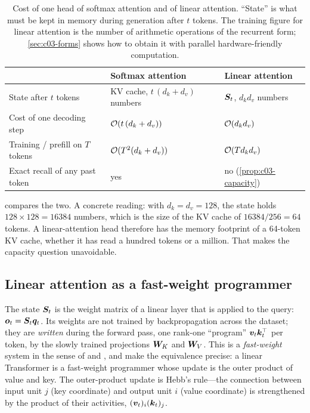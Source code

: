 \begin{table}[t]
\centering
\caption{Cost of one head of softmax attention and of linear attention. ``State'' is what must
be kept in memory during generation after $t$ tokens. The training figure for linear attention
is the number of arithmetic operations of the recurrent form; \cref{sec:c03-forms} shows how to
obtain it with parallel hardware-friendly computation.}
\label{tab:c03-cost}
\begin{tabular}{lll}
\toprule
 & Softmax attention & Linear attention \\
\midrule
State after $t$ tokens & KV cache, $t\,(d_k+d_v)$ numbers & $\bm{S}_t$, $d_k d_v$ numbers \\
Cost of one decoding step & $\mathcal{O}(t\,(d_k+d_v))$ & $\mathcal{O}(d_k d_v)$ \\
Training / prefill on $T$ tokens & $\mathcal{O}(T^2(d_k+d_v))$ & $\mathcal{O}(T d_k d_v)$ \\
Exact recall of any past token & yes & no (\cref{prop:c03-capacity}) \\
\bottomrule
\end{tabular}
\end{table}

 compares the two. A concrete reading: with $d_k=d_v=128$, the state holds
$128\times 128=16384$ numbers, which is the size of the KV cache of $16384/256=64$ tokens. A
linear-attention head therefore has the memory footprint of a 64-token KV cache, whether it has
read a hundred tokens or a million. That makes the capacity question unavoidable.

\subsection{Linear attention as a fast-weight programmer}

The state $\bm{S}_t$ is the weight matrix of a linear layer that is applied to the query:
$\bm{o}_t=\bm{S}_t\bm{q}_t$. Its weights are not trained by backpropagation across the dataset; they are
\emph{written} during the forward pass, one rank-one ``program'' $\bm{v}_t\bm{k}_t^{\top}$ per token, by
the slowly trained projections $\bm{W}_K$ and $\bm{W}_V$. This is a \emph{fast-weight} system in the
sense of \citet{schmidhuber1992fastweights} and \citet{ba2016fastweights}, and
\citet{c02-schlag2021linear} make the equivalence precise: a linear Transformer is a fast-weight
programmer whose update is the outer product of value and key. The outer-product update is
Hebb's rule---the connection between input unit $j$ (key coordinate) and output unit $i$ (value
coordinate) is strengthened by the product of their activities, $(\bm{v}_t)_i(\bm{k}_t)_j$.

